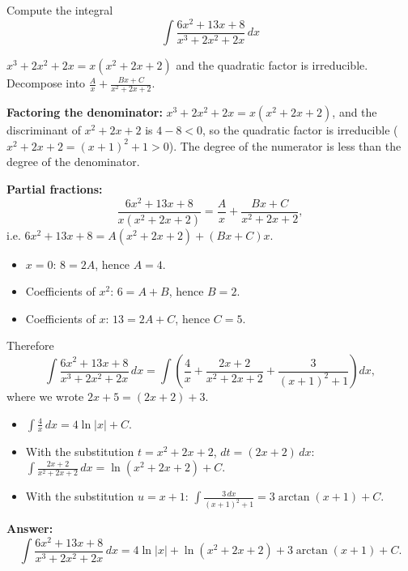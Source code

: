 
\begin{question}
Compute the integral
\[ \int \frac{6x^2 + 13x + 8}{x^3 + 2x^2 + 2x}\,dx \]
\end{question}

\begin{hint}
$x^3 + 2x^2 + 2x = x(x^2 + 2x + 2)$ and the quadratic factor is irreducible. Decompose into $\frac{A}{x} + \frac{Bx + C}{x^2 + 2x + 2}$.
\end{hint}

\begin{solution}
\textbf{Factoring the denominator:} $x^3 + 2x^2 + 2x = x(x^2 + 2x + 2)$, and the discriminant of $x^2 + 2x + 2$ is $4 - 8 < 0$, so the quadratic factor is irreducible ($x^2 + 2x + 2 = (x + 1)^2 + 1 > 0$). The degree of the numerator is less than the degree of the denominator.

\textbf{Partial fractions:}
\[ \frac{6x^2 + 13x + 8}{x(x^2 + 2x + 2)} = \frac{A}{x} + \frac{Bx + C}{x^2 + 2x + 2}, \]
i.e. $6x^2 + 13x + 8 = A(x^2 + 2x + 2) + (Bx + C)x$.
\begin{itemize}
  \item $x = 0$: $8 = 2A$, hence $A = 4$.
  \item Coefficients of $x^2$: $6 = A + B$, hence $B = 2$.
  \item Coefficients of $x$: $13 = 2A + C$, hence $C = 5$.
\end{itemize}
Therefore
\[ \int \frac{6x^2 + 13x + 8}{x^3 + 2x^2 + 2x}\,dx = \int \left( \frac4x + \frac{2x + 2}{x^2 + 2x + 2} + \frac{3}{(x + 1)^2 + 1} \right) dx, \]
where we wrote $2x + 5 = (2x + 2) + 3$.
\begin{itemize}
  \item $\int \frac4x\,dx = 4\ln|x| + C$.
  \item With the substitution $t = x^2 + 2x + 2$, $dt = (2x + 2)\,dx$: $\int \frac{2x + 2}{x^2 + 2x + 2}\,dx = \ln(x^2 + 2x + 2) + C$.
  \item With the substitution $u = x + 1$: $\int \frac{3\,dx}{(x + 1)^2 + 1} = 3\arctan(x + 1) + C$.
\end{itemize}
\textbf{Answer:}
\[ \boxed{\int \frac{6x^2 + 13x + 8}{x^3 + 2x^2 + 2x}\,dx = 4\ln|x| + \ln(x^2 + 2x + 2) + 3\arctan(x + 1) + C.} \]
\end{solution}
